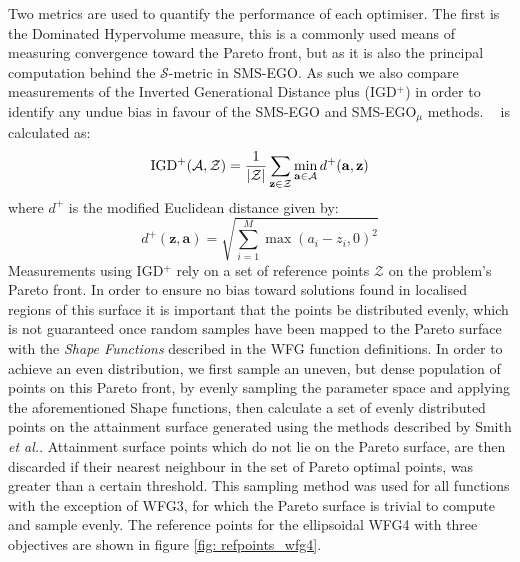 \documentclass[conference]{IEEEtran}
\makeatletter
\DeclarePairedDelimiter\abs{\lvert}{\rvert}%
\newcommand{\attainmentfront}{\mathcal{A}}
\newcommand{\nobj}{M}
\DeclareMathOperator*{\igdp}{IGD^{+}}
\newcommand\hpv{Dominated Hypervolume\xspace}
\newcommand\smsego{SMS-EGO\xspace}
\newcommand\smsegomu{SMS-EGO$_{\mu}$\xspace}
\newcommand\igd{IGD$^+$\xspace}
\newcommand{\pigdref}{\mathcal{Z}}
\newcommand*{\etal}{\textit{et al.}\@\xspace}
\makeatother
\begin{document}
Two metrics are used to quantify the performance of each optimiser. The first is the \hpv measure, this is a commonly used means of measuring convergence toward the Pareto front, but as it is also the principal computation behind the $\mathcal{S}$-metric in \smsego. As such we also compare measurements of the Inverted Generational Distance plus (\igd) \cite{ishibuchi2015modified} in order to identify any undue bias in favour of the \smsego and \smsegomu methods. $\igdp$ is calculated as:
\begin{equation}
    \igdp(\attainmentfront, \pigdref) = \frac{1}{\abs{\pigdref}}
    \sum_{\mathbf{z}\in\pigdref} \min_{\mathbf{a}\in \attainmentfront} d^{+}(\mathbf{a}, \mathbf{z})
\end{equation}
where $d^{+}$ is the modified Euclidean distance given by:
\begin{equation}
    d^+(\mathbf{z}, \mathbf{a}) = \sqrt{\sum^{\nobj}_{i=1}\max(a_i - z_i, 0)^2}
\end{equation}
Measurements using \igd rely on a set of reference points $\pigdref$ on the problem's Pareto front. In order to ensure no bias toward solutions found in localised regions of this surface it is important that the points be distributed evenly, which is not guaranteed once random samples have been mapped to the Pareto surface with the \textit{Shape Functions} described in the WFG function definitions. In order to achieve an even distribution, we first sample an uneven, but dense population of points on this Pareto front, by evenly sampling the parameter space and applying the aforementioned Shape functions, then calculate a set of evenly distributed points on the attainment surface generated using the methods described by Smith \etal \cite{smith2004dominance}. Attainment surface points which do not lie on the Pareto surface, are then discarded if their nearest neighbour in the set of Pareto optimal points, was greater than a certain threshold. This sampling method was used for all functions with the exception of WFG3, for which the Pareto surface is trivial to compute and sample evenly. The reference points for the ellipsoidal WFG4 with three objectives are shown in figure \ref{fig: refpoints_wfg4}.  
\end{document}
